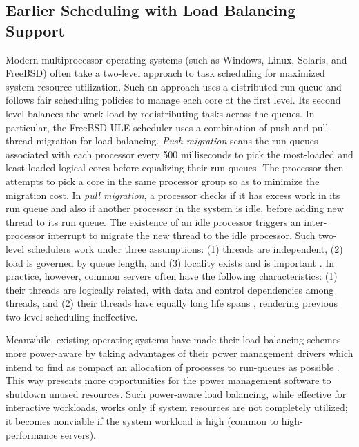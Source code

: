 \documentclass[times, 10pt,twocolumn]{IEEEtran}
\begin{document}
\subsection{Earlier Scheduling with Load Balancing Support}
\label{sec:therm-comp-workl}
Modern multiprocessor operating systems (such as Windows, Linux,
Solaris, and FreeBSD) often take a two-level approach to task scheduling
for maximized system resource utilization.  Such an approach uses a
distributed run queue and follows fair scheduling policies to manage
each core at the first level.  Its second level balances the work load
by redistributing tasks across the queues.  In particular, the FreeBSD
ULE scheduler \cite{McKusick2004} uses a
combination of push and pull thread migration for load balancing.
\textit{Push migration} scans the run queues associated with each
processor every 500 milliseconds to pick the most-loaded and
least-loaded logical cores before equalizing their run-queues.  The
processor then attempts to pick a core in the same processor group so as
to minimize the migration cost.  In \textit{pull migration}, a processor
checks if it has excess work in its run queue and also if another
processor in the system is idle, before adding new thread to its run
queue.  The existence of an idle processor triggers an inter-processor
interrupt to migrate the new thread to the idle processor.  Such
two-level schedulers work under three assumptions: (1) threads are
independent, (2) load is governed by queue length, and (3) locality
exists and is important \cite{Hofmeyr2010}.  In practice, however,
common servers often have the following characteristics: (1) their
threads are logically related, with data and control dependencies among
threads, and (2) their threads have equally long life spans
\cite{Hofmeyr2010}, rendering previous two-level scheduling ineffective.

Meanwhile, existing operating systems have made their load balancing
schemes more power-aware by taking advantages of their power management
drivers which intend to find as compact an allocation of processes to
run-queues as possible \cite{Sun2009,Xia2010,Sarood2011}.  This
way presents more opportunities for the power management software to
shutdown unused resources.  Such power-aware load balancing, while
effective for interactive workloads, works only if system resources are
not completely utilized; it becomes nonviable if the system workload is
high (common to high-performance servers).
\end{document}
